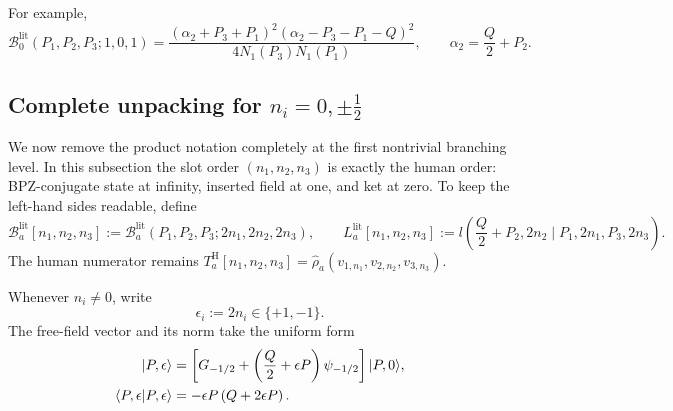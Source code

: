 \documentclass[11pt]{article}
\newcommand{\hatrho}{\widehat\rho}
\begin{document}
For example,
\begin{equation}
 \mathcal B_0^{\mathrm{lit}}(P_1,P_2,P_3;1,0,1)
 =\frac{
  (\alpha_2+P_3+P_1)^2
  (\alpha_2-P_3-P_1-Q)^2
 }{
  4N_1(P_3)N_1(P_1)
 },
 \qquad \alpha_2=\frac Q2+P_2.
 \label{eq:B-example}
\end{equation}

\subsection{Complete unpacking for
\texorpdfstring{\(n_i=0,\pm\frac12\)}{ni = 0, +/- 1/2}}

We now remove the product notation completely at the first nontrivial
branching level.  In this subsection the slot order
\((n_1,n_2,n_3)\) is exactly the human order: BPZ-conjugate state at
infinity, inserted field at one, and ket at zero.  To keep the left-hand
sides readable, define
\begin{equation}
 \mathcal B_a^{\mathrm{lit}}[n_1,n_2,n_3]
 :=\mathcal B_a^{\mathrm{lit}}(P_1,P_2,P_3;2n_1,2n_2,2n_3),
 \qquad
 L_a^{\mathrm{lit}}[n_1,n_2,n_3]
 :=l\left(\frac Q2+P_2,2n_2\mid P_1,2n_1,P_3,2n_3\right).
 \label{eq:small-n-slot-notation}
\end{equation}
The human numerator remains
\(T_a^{\mathrm H}[n_1,n_2,n_3]
=\hatrho_a(v_{1,n_1},v_{2,n_2},v_{3,n_3})\).

Whenever \(n_i\ne0\), write
\begin{equation}
 \epsilon_i:=2n_i\in\{+1,-1\}.
 \label{eq:small-n-epsilon}
\end{equation}
The free-field vector and its norm take the uniform form
\begin{align}
 |P,\epsilon\rangle
 &=\left[
 G_{-1/2}+\left(\frac Q2+\epsilon P\right)\psi_{-1/2}
 \right]|P,0\rangle,
 \notag\\
 \langle P,\epsilon|P,\epsilon\rangle
 &=-\epsilon P\left(Q+2\epsilon P\right).
 \label{eq:small-n-vector-and-norm}
\end{align}
\end{document}
